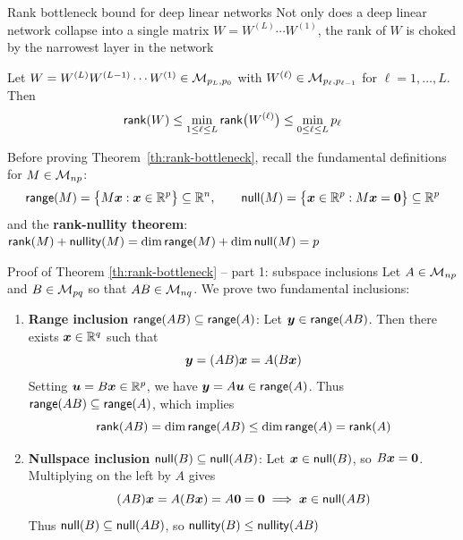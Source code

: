 \documentclass[aspectratio=169]{beamer}\usepackage[]{graphicx}\usepackage[]{xcolor}
\begin{document}
\begin{frame}{Rank bottleneck bound for deep linear networks}
Not only does a deep linear network collapse into a single matrix $W = W^{(L)} \cdots W^{(1)}$, the rank of $W$ is choked by the narrowest layer in the network
\vfill
\begin{importanttheorem}
\label{th:rank-bottleneck}
Let $W = W^{(L)} W^{(L-1)} \cdots W^{(1)} \in \mathcal{M}_{p_L, p_0}$ with $W^{(\ell)} \in \mathcal{M}_{p_\ell, p_{\ell-1}}$ for $\ell = 1, \ldots, L$. Then
\[
\mathsf{rank}(W) \le \min_{1 \le \ell \le L} \mathsf{rank}\big(W^{(\ell)}\big) \le \min_{0 \le \ell \le L} p_\ell
\]
\end{importanttheorem}
\vfill
Before proving Theorem~\ref{th:rank-bottleneck}, recall the fundamental definitions for $M \in \mathcal{M}_{np}$:
\[
\range(M) = \big\{ M\bx : \bx \in \IR^p \big\} \subseteq \IR^n, \qquad
\nullspace(M) = \big\{ \bx \in \IR^p : M\bx = \b0 \big\} \subseteq \IR^p
\]
and the \textbf{rank-nullity theorem}: $\mathsf{rank}(M) + \mathsf{nullity}(M) = \dim\mathsf{range}(M) + \dim\mathsf{null}(M) = p$
\end{frame}


\begin{frame}[red]{Proof of Theorem \ref{th:rank-bottleneck} -- part 1: subspace inclusions}
Let $A \in \mathcal{M}_{np}$ and $B \in \mathcal{M}_{pq}$ so that $AB \in \mathcal{M}_{nq}$. We prove two fundamental inclusions:
\vfill
\begin{enumerate}
\item \textbf{Range inclusion} $\mathsf{range}(AB) \subseteq \mathsf{range}(A)$:
Let $\bm{y} \in \mathsf{range}(AB)$. Then there exists $\bm{x} \in \mathbb{R}^q$ such that
\[
\bm{y} = (AB)\bm{x} = A(B\bm{x})
\]
Setting $\bm{u} = B\bm{x} \in \mathbb{R}^p$, we have $\bm{y} = A\bm{u} \in \mathsf{range}(A)$. Thus $\mathsf{range}(AB) \subseteq \mathsf{range}(A)$, which implies
\[
\mathsf{rank}(AB) = \dim\mathsf{range}(AB) \le \dim\mathsf{range}(A) = \mathsf{rank}(A)
\]
\vfill
\item \textbf{Nullspace inclusion} $\mathsf{null}(B) \subseteq \mathsf{null}(AB)$:
Let $\bm{x} \in \mathsf{null}(B)$, so $B\bx = \b0$. Multiplying on the left by $A$ gives
\[
(AB)\bx = A(B\bx) = A\b0 = \b0 \implies \bx \in \nullspace(AB)
\]
Thus $\mathsf{null}(B) \subseteq \mathsf{null}(AB)$, so $\mathsf{nullity}(B) \le \mathsf{nullity}(AB)$
\end{enumerate}
\end{frame}
\end{document}
